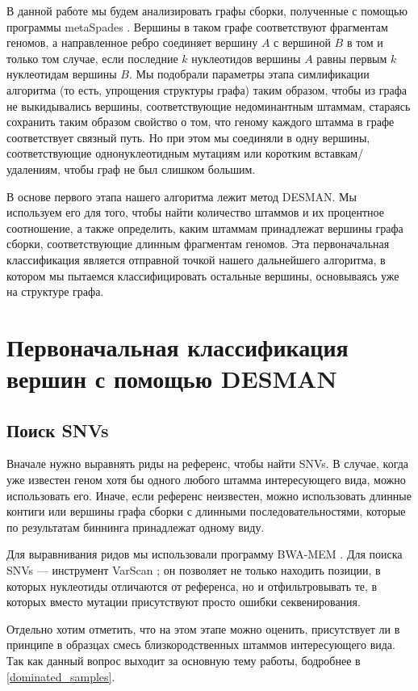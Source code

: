 \documentclass{spbau-diploma}
\begin{document}
В данной работе мы будем анализировать графы сборки, полученные с помощью программы metaSpades \cite{MetaSpades}. Вершины в таком графе соответствуют фрагментам геномов, а направленное ребро соединяет вершину $A$ с вершиной $B$ в том и только том случае, если последние $k$ нуклеотидов вершины $A$ равны первым $k$ нуклеотидам вершины $B$. Мы подобрали параметры этапа симлификации алгоритма (то есть, упрощения структуры графа) таким образом, чтобы из графа не выкидывались вершины, соответствующие недоминантным штаммам, стараясь сохранить таким образом свойство о том, что геному каждого штамма в графе соответствует связный путь. Но при этом мы соединяли в одну вершины, соответствующие однонуклеотидным мутациям или коротким вставкам/удалениям, чтобы граф не был слишком большим.

В основе первого этапа нашего алгоритма лежит метод DESMAN. Мы используем его для того, чтобы найти количество штаммов и их процентное соотношение, а также определить, каким штаммам принадлежат вершины графа сборки, соответствующие длинным фрагментам геномов. Эта первоначальная классификация является отправной точкой нашего дальнейшего алгоритма, в котором мы пытаемся классифицировать остальные вершины, основываясь уже на структуре графа.



\section{Первоначальная классификация вершин с помощью DESMAN}

\subsection{Поиск SNVs}

Вначале нужно выравнять риды на референс, чтобы найти SNVs. В случае, когда уже известен геном хотя бы одного любого штамма интересующего вида, можно использовать его. Иначе, если референс неизвестен, можно использовать длинные контиги или вершины графа сборки с длинными последовательностями, которые по результатам биннинга принадлежат одному виду. 

Для выравнивания ридов мы использовали программу BWA-MEM \cite{bwa_mem}. Для поиска SNVs --- инструмент VarScan \cite{VarScan}; он позволяет не только находить позиции, в которых нуклеотиды отличаются от референса, но и отфильтровывать те, в которых вместо мутации присутствуют просто ошибки секвенирования. 

Отдельно хотим отметить, что на этом этапе можно оценить, присутствует ли в принципе в образцах смесь близкородственных штаммов интересующего вида. Так как данный вопрос выходит за основную тему работы, бодробнее в \ref{dominated_samples}.
\end{document}
